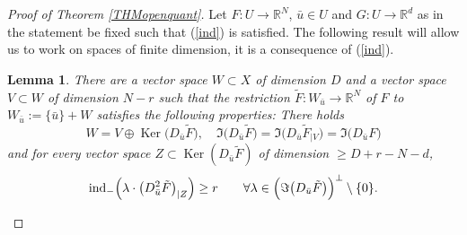 \documentclass[JEP,XML,SOM,Unicode,NoFloatCountersInSection,published]{cedram}
\DeclareMathOperator{\Ker}{Ker}
\newcommand\R{\mathbb R}
\newtheorem{lemma}[theorem]{Lemma}
\theoremstyle{definition}
\begin{document}
\begin{proof}[Proof of Theorem \ref{THMopenquant}]
Let $F: U \to \R^N$, $\bar{u} \in U$ and $G:U \to \R^d$ as in the statement be fixed such that (\ref{ind}) is satisfied. The following result will allow us to work on spaces of finite dimension, it is a consequence of (\ref{ind}).

\begin{lemma}\label{11jan1}
There are a vector space $W\subset X$ of dimension $D$ and a vector space $V\subset W$ of dimension $N-r$ such that the restriction $\tilde{F}:W_{\bar{u}} \to \R^N$ of $F$ to $W_{\bar{u}} := \{\bar{u}\} + W$ satisfies the following properties: There holds
\begin{equation}\label{13janv1}
W = V \oplus \Ker\bigl(D_{\bar{u}}\tilde{F}\bigr), \quad \Im \bigl(D_{\bar{u}} \tilde{F} \bigr)=\Im \bigl(D_{\bar{u}} \tilde{F}_{\vert V} \bigr)=\Im \bigl(D_{\bar{u}} F \bigr)
\end{equation}
and for every vector space $Z\subset \Ker(D_{\bar{u}}\tilde{F})$ of dimension $\geq D+r-N-d$,
\begin{equation}\label{EQ11jan1}
\mathrm{ind}_- \Bigl(\lambda \cdot \bigl(D^2_{\bar{u}} \tilde{F} \bigr)_{\vert Z} \Bigr) \geq r \qquad \forall \lambda \in \Bigl(\Im \bigl(D_{\bar{u}} \tilde{F} \bigr)\Bigr)^{\perp} \setminus \{0\}.
\end{equation}
\end{lemma}


\end{proof}
\end{document}
